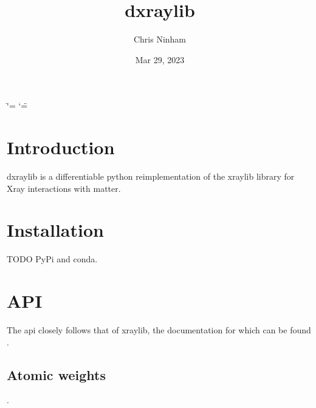 \documentclass[letterpaper,10pt,english,openany,oneside]{sphinxmanual}
\title{dxraylib}
\date{Mar 29, 2023}
\author{Chris Ninham}
\begin{document}
\ifdefined\shorthandoff
  \ifnum\catcode`\=\string=\active\shorthandoff{=}\fi
  \ifnum\catcode`\"=\active{}\fi
\fi

\pagestyle{empty}
\sphinxmaketitle
\pagestyle{plain}
\sphinxtableofcontents
\pagestyle{normal}
\label{\detokenize{index::doc}}


\sphinxstepscope


\chapter{Introduction}
\label{\detokenize{introduction:introduction}}\label{\detokenize{introduction::doc}}
\sphinxAtStartPar
dxraylib is a differentiable python reimplementation of the xraylib library
for X\sphinxhyphen{}ray interactions with matter.

\sphinxstepscope


\chapter{Installation}
\label{\detokenize{install:installation}}\label{\detokenize{install::doc}}
\sphinxAtStartPar
TODO PyPi and conda.

\sphinxstepscope


\chapter{API}
\label{\detokenize{api:api}}\label{\detokenize{api::doc}}
\sphinxAtStartPar
The api closely follows that of xraylib, the documentation for which can be
found .

\sphinxstepscope


\section{Atomic weights}
\label{\detokenize{api/atomic_weights:atomic-weights}}\label{\detokenize{api/atomic_weights::doc}}
\sphinxAtStartPar
{}.
\end{document}
